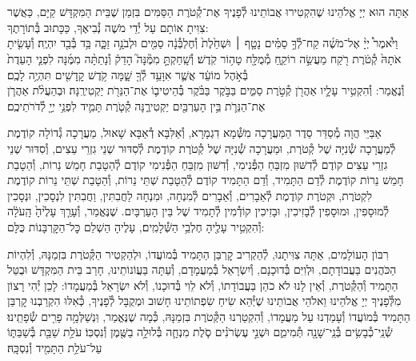 \documentclass[twoside, openany, parskip=half, 11pt]{book}
\begin{document}
\newcommand{\ketoret}{
אַתָּה הוּא יְיָ אֱלֹהֵינוּ שֶׁהִקְטִירוּ אֲבוֹתֵינוּ לְ֯פָנֶיךָ אֶת־קְ֯טֹרֶת הַסַּמִּים בִּזְמַן שֶׁבֵּית הַמִּקְדָּשׁ קַיָּם, כַּאֲשֶׁר צִוִּיתָ אוֹתָם עַל יְ֯דֵי מֹשֶׁה נְ֯בִיאֶךָ, כַּכָּתוּב בְּ֯תוֹרָתֶךָ:\\
וַיֹּ֩אמֶר֩ יְיָ֨ אֶל־מֹשֶׁ֜ה קַח־לְ֯ךָ֣ סַמִּ֗ים\source{שמות ל} נָטָ֤ף ׀ וּשְׁחֵ֙לֶת֙ וְ֯חֶלְבְּ֯נָ֔ה סַמִּ֖ים וּלְבֹנָ֣ה זַכָּ֑ה בַּ֥ד בְּ֯בַ֖ד יִהְיֶֽה׃ וְ֯עָשִׂ֤יתָ אֹתָהּ֙ קְ֯טֹ֔רֶת רֹ֖קַח מַעֲשֵׂ֣ה רוֹקֵ֑חַ מְ֯מֻלָּ֖ח טָה֥וֹר קֹֽדֶשׁ׃ וְ֯שָֽׁחַקְתָּ֣ מִמֶּ֘נָּה֮ הָדֵק֒ וְ֯נָתַתָּ֨ה מִמֶּ֜נָּה לִפְנֵ֤י הָעֵדֻת֙ בְּ֯אֹ֣הֶל מוֹעֵ֔ד אֲשֶׁ֛ר אִוָּעֵ֥ד לְ֯ךָ֖ שָׁ֑מָּה קֹ֥דֶשׁ קׇֽדָשִׁ֖ים תִּהְיֶ֥ה לָכֶֽם׃\\
וְ֯נֶאֱמַר: וְ֯הִקְטִ֥יר עָלָ֛יו אַהֲרֹ֖ן קְ֯טֹ֣רֶת סַמִּ֑ים בַּבֹּ֣קֶר בַּבֹּ֗קֶר בְּ֯הֵיטִיב֛וֹ אֶת־הַנֵּרֹ֖ת יַקְטִירֶֽנָּה׃ וּבְהַעֲלֹ֨ת אַהֲרֹ֧ן אֶת־הַנֵּרֹ֛ת בֵּ֥ין הָעַרְבַּ֖יִם יַקְטִירֶ֑נָּה קְ֯טֹ֧רֶת תָּמִ֛יד לִפְנֵ֥י יְיָ֖ לְ֯דֹרֹתֵיכֶֽם׃


}
\\
\tamid
\\
\ketoret
אַבַּיֵּי הֲוָה מְ֯סַדֵּר סֵדֶר הַמַּעֲרָכָה  מִשְּׁ֯מָא דִגְמָרָא, וְ֯אַלִּבָּא דְ֯אַבָּא שָׁאוּל, מַעֲרָכָה גְ֯דוֹלָה קוֹדֶמֶת לְ֯מַעֲרָכָה שְׁ֯נִיָּה שֶׁל קְ֯טֹרֶת, וּמַעֲרָכָה שְׁ֯נִיָּה שֶׁל קְ֯טֹרֶת קוֹדֶמֶת לְ֯סִדּוּר שְׁנֵי גִזְרֵי עֵצִים, וְ֯סִדּוּר שְׁנֵי גִזְרֵי עֵצִים קוֹדֶם לְ֯דִשּׁוּן מִזְבֵּחַ הַפְּ֯נִימִי, וְ֯דִשּׁוּן מִזְבֵּחַ הַפְּ֯נִימִי קוֹדֶם לְ֯הַטָבַת חָמֵשׁ נֵרוֹת, וְ֯הַטָבַת חָמֵשׁ נֵרוֹת קוֹדֶמֶת לְ֯דַם הַתָּמִיד, וְ֯דַם הַתָּמִיד קוֹדֶם לְ֯הַטָבַת שְׁתֵּי נֵרוֹת, וְ֯הַטָבַת שְׁתֵּי נֵרוֹת קוֹדֶמֶת לִקְטֹרֶת, וּקְטֹרֶת קוֹדֶמֶת לְ֯אֵבָרִים, וְ֯אֵבָרִים לְ֯מִנְחָה, וּמִנְחָה לַחֲבִתִּין, וַחֲבִתִּין לִנְסָכִין, וּנְסָכִין לְ֯מוּסָפִין, וּמוּסָפִין לְ֯בָזִיכִין, וּבָזִיכִין קוֹדְ֯מִין לְ֯תָמִיד שֶׁל בֵּין הָעַרְבָּיִם. שֶׁנֶּאֱמַר, וְ֯עָרַ֤ךְ  עָלֶ֙יהָ֙ הָֽעֹלָ֔ה וְ֯הִקְטִ֥יר עָלֶ֖יהָ חֶלְבֵ֥י הַשְּׁ֯לָמִֽים׃, עָלֶיהָ הַשְׁלֵם כׇּל־הַקׇּרְבָּנוֹת כֻּלָּם:

רִבּוֹן הָעוֹלָמִים, אַתָּה צִוִּיתָנוּ, לְ֯הַקְרִיב קׇרְבַּן הַתָּמִיד בְּ֯מוֹעֲדוֹ, וּלְהַקְטִיר הַקְּ֯טֹרֶת בִּזְמַנָּהּ, וְ֯לִהְיוֹת הַכֹּהֲנִים בַּעֲבוֹדָתָם, וּלְוִיִּם בְּ֯דוּכָנָם, וְ֯יִשְׂרָאֵל בְּ֯מַעֲמָדָם, וְ֯עַתָּה בַּעֲוֹנוֹתֵינוּ, חָרַב בֵּית הַמִּקְדָּשׁ וּבֻטַּל הַתָּמִיד וְ֯הַקְּ֯טֹרֶת, וְ֯אֵין לָנוּ לֹא כֹהֵן בַּעֲבוֹדָתוֹ, וְ֯לֹא לֵוִי בְּ֯דוּכָנוֹ, וְ֯לֹא יִשְׂרָאֵל בְּ֯מַעֲמָדוֹ: לָכֵן יְ֯הִי רָצוֹן מִלְּ֯פָנֶיךָ יְיָ אֱלֹהֵינוּ וֵאלֹהֵי אֲבוֹתֵינוּ שֶׁיְּ֯הֵא שִׂיחַ שִׂפְתוֹתֵינוּ חָשׁוּב וּמְקֻבָּל לְ֯פָנֶיךָ, כְּ֯אִלּוּ הִקְרַבְנוּ קׇרְבַּן הַתָּמִיד בְּ֯מוֹעֲדוֹ וְ֯עָמַדְנוּ עַל מַעֲמָדוֹ, וְ֯הִקְטַרְנוּ הַקְּ֯טֹרֶת בִּזְמַנָּהּ, כְּ֯מָה שֶׁנֶּאֱמַר, וּֽנְשַׁלְּמָ֥ה  פָרִ֖ים שְׂ֯פָתֵֽינוּ׃\\
\shabbos
{}
שְׁ֯נֵֽי־כְ֯בָשִׂ֥ים בְּ֯נֵֽי־שָׁנָ֖ה תְּ֯מִימִ֑ם וּשְׁנֵ֣י עֶשְׂרֹנִ֗ים סֹ֧לֶת מִנְחָ֛ה בְּ֯לוּלָ֥ה בַשֶּׁ֖מֶן וְ֯נִסְכּֽוֹ׃
עֹלַ֥ת שַׁבַּ֖ת בְּ֯שַׁבַּתּ֑וֹ עַל־עֹלַ֥ת הַתָּמִ֖יד וְ֯נִסְכָּֽהּ׃
\end{document}
